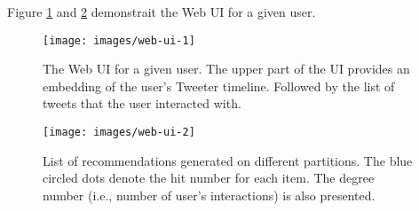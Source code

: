 Figure \ref{fig:web-ui-example-1} and \ref{fig:web-ui-example-2} demonstrait the Web UI for a given user.

\begin{figure}[!htb]
	\centering
	\texttt{[image: images/web-ui-1]}
	\caption{The Web UI for a given user. The upper part of the UI provides an embedding of the user's Tweeter timeline. Followed by the list of tweets that the user interacted with.}
	\label{fig:web-ui-example-1}
\end{figure}

\begin{figure}[!htb]
	\centering
	\texttt{[image: images/web-ui-2]}
	\caption{List of recommendations generated on different partitions. The blue circled dots denote the hit number for each item. The degree number (i.e., number of user's interactions) is also presented.}
	\label{fig:web-ui-example-2}
\end{figure}
